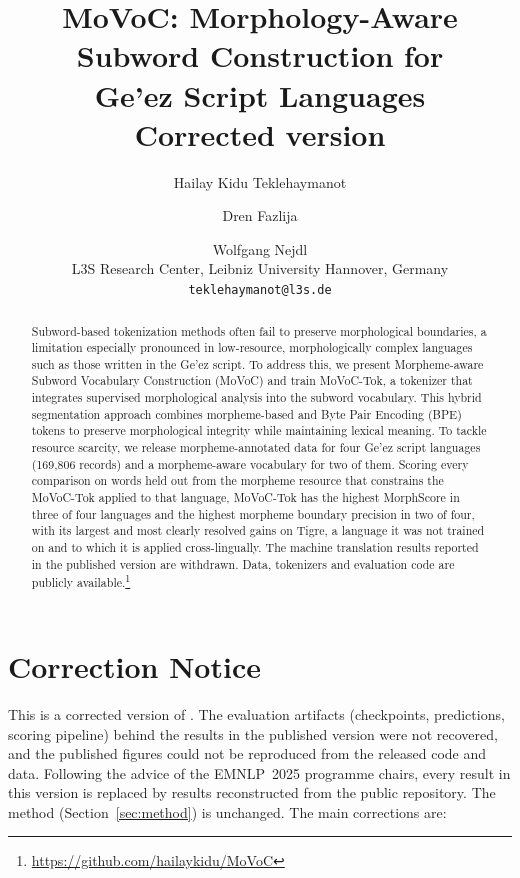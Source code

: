 \documentclass[11pt]{article}
\title{MoVoC: Morphology-Aware Subword Construction for\\ Ge'ez Script Languages\\[2pt]
\normalsize\normalfont Corrected version}
\author{Hailay Kidu Teklehaymanot \and Dren Fazlija \and Wolfgang Nejdl \\
  L3S Research Center, Leibniz University Hannover, Germany \\
  \texttt{teklehaymanot@l3s.de}}
\newcommand{\movoctok}{MoVoC-Tok}
\begin{document}
\maketitle

\begin{abstract}
Subword-based tokenization methods often fail to preserve morphological
boundaries, a limitation especially pronounced in low-resource, morphologically
complex languages such as those written in the Ge'ez script. To address this,
we present Morpheme-aware Subword Vocabulary Construction (MoVoC) and train
\movoctok{}, a tokenizer that integrates supervised morphological analysis into
the subword vocabulary. This hybrid segmentation approach combines
morpheme-based and Byte Pair Encoding (BPE) tokens to preserve morphological
integrity while maintaining lexical meaning. To tackle resource scarcity, we
release morpheme-annotated data for four Ge'ez script languages (169,806
records) and a morpheme-aware vocabulary for two of them. Scoring every
comparison on words held out from the morpheme resource that constrains the
\movoctok{} applied to that language, \movoctok{} has the highest MorphScore
in three of four languages and the highest morpheme boundary precision in two
of four, with its largest and most clearly resolved gains on Tigre, a language
it was not trained on and to which it is applied cross-lingually. The machine
translation results reported in the published version are withdrawn. Data,
tokenizers and evaluation code are publicly
available.\footnote{\url{https://github.com/hailaykidu/MoVoC}}
\end{abstract}

\section*{Correction Notice}
\label{sec:notice}

This is a corrected version of \citet{teklehaymanot-etal-2025-movoc}. The
evaluation artifacts (checkpoints, predictions, scoring pipeline) behind the
results in the published version were not recovered, and the published figures
could not be reproduced from the released code and data. Following the advice
of the EMNLP~2025 programme chairs, every result in this version is replaced
by results reconstructed from the public repository. The method
(Section~\ref{sec:method}) is unchanged. The main corrections are:
\end{document}
